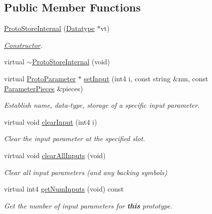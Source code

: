 \subsection*{Public Member Functions}
\begin{DoxyCompactItemize}
\item 
\mbox{\hyperlink{class_proto_store_internal_a16f69dbe9bc548f8bee41daa68c28ee5}{Proto\+Store\+Internal}} (\mbox{\hyperlink{class_datatype}{Datatype}} $\ast$vt)
\begin{DoxyCompactList}\small\item\em \mbox{\hyperlink{class_constructor}{Constructor}}. \end{DoxyCompactList}\item 
virtual \mbox{\hyperlink{class_proto_store_internal_ae92712360ba192411e2bbc6a3f5b3366}{$\sim$\+Proto\+Store\+Internal}} (void)
\item 
virtual \mbox{\hyperlink{class_proto_parameter}{Proto\+Parameter}} $\ast$ \mbox{\hyperlink{class_proto_store_internal_a37baf5313582d2748bc012b95a651076}{set\+Input}} (int4 i, const string \&nm, const \mbox{\hyperlink{struct_parameter_pieces}{Parameter\+Pieces}} \&pieces)
\begin{DoxyCompactList}\small\item\em Establish name, data-\/type, storage of a specific input parameter. \end{DoxyCompactList}\item 
virtual void \mbox{\hyperlink{class_proto_store_internal_ae3948caba06771c1df6dea3af57d55c1}{clear\+Input}} (int4 i)
\begin{DoxyCompactList}\small\item\em Clear the input parameter at the specified slot. \end{DoxyCompactList}\item 
virtual void \mbox{\hyperlink{class_proto_store_internal_a42caab4f3ba540a08e6c130f7e52a8ff}{clear\+All\+Inputs}} (void)
\begin{DoxyCompactList}\small\item\em Clear all input parameters (and any backing symbols) \end{DoxyCompactList}\item 
virtual int4 \mbox{\hyperlink{class_proto_store_internal_a3114aa2721c50c2ffa1bca2912d3f5ff}{get\+Num\+Inputs}} (void) const
\begin{DoxyCompactList}\small\item\em Get the number of input parameters for {\bfseries{this}} prototype. \end{DoxyCompactList}\item 

\end{DoxyCompactItemize}

